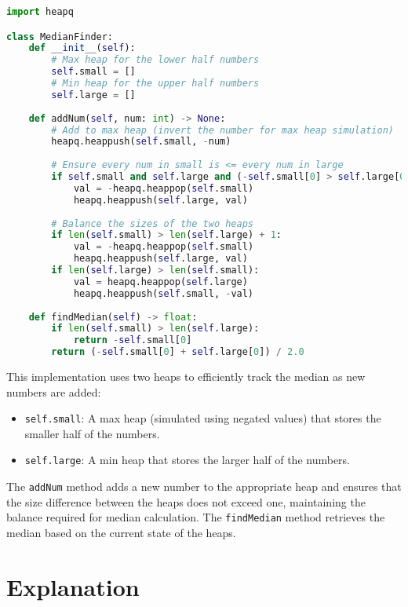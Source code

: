 \begin{fullwidth}
\begin{lstlisting}[language=Python]
import heapq

class MedianFinder:
    def __init__(self):
        # Max heap for the lower half numbers
        self.small = []
        # Min heap for the upper half numbers
        self.large = []
    
    def addNum(self, num: int) -> None:
        # Add to max heap (invert the number for max heap simulation)
        heapq.heappush(self.small, -num)
        
        # Ensure every num in small is <= every num in large
        if self.small and self.large and (-self.small[0] > self.large[0]):
            val = -heapq.heappop(self.small)
            heapq.heappush(self.large, val)
        
        # Balance the sizes of the two heaps
        if len(self.small) > len(self.large) + 1:
            val = -heapq.heappop(self.small)
            heapq.heappush(self.large, val)
        if len(self.large) > len(self.small):
            val = heapq.heappop(self.large)
            heapq.heappush(self.small, -val)
    
    def findMedian(self) -> float:
        if len(self.small) > len(self.large):
            return -self.small[0]
        return (-self.small[0] + self.large[0]) / 2.0
\end{lstlisting}
\end{fullwidth}

This implementation uses two heaps to efficiently track the median as new numbers are added:

\begin{itemize}
    \item \texttt{self.small}: A max heap (simulated using negated values) that stores the smaller half of the numbers.
    \item \texttt{self.large}: A min heap that stores the larger half of the numbers.
\end{itemize}

The \texttt{addNum} method adds a new number to the appropriate heap and ensures that the size difference between the heaps does not exceed one, maintaining the balance required for median calculation. The \texttt{findMedian} method retrieves the median based on the current state of the heaps.

\section*{Explanation}


